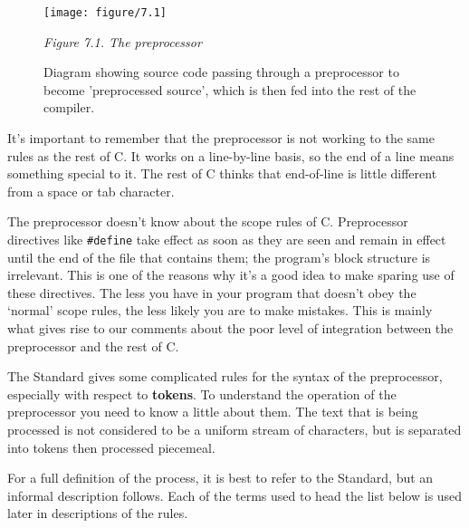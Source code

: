    \begin{figure*}[htb]\centering
     \texttt{[image: figure/7.1]}
     \caption{Diagram showing source code
       passing through a preprocessor to become 'preprocessed source',
       which is then fed into the rest of the compiler.}
   \begin{center}\textit{Figure 7.1. The preprocessor}\end{center}
   \end{figure*}



  It's important to remember that the preprocessor is not working to the
   same rules as the rest of C. It works on a line-by-line basis, so the end
   of a line means something special to it. The rest of C thinks that
   end-of-line is little different from a space or tab character.


  The preprocessor doesn't know about the scope rules of C. Preprocessor
   directives like \texttt{\#define} take effect as soon as they are seen
   and remain in effect until the end of the file that contains them; the
   program's block structure is irrelevant. This is one of the reasons why
   it's a good idea to make sparing use of these directives. The less you
   have in your program that doesn't obey the `normal' scope rules,
   the less likely you are to make mistakes. This is mainly what gives rise
   to our comments about the poor level of integration between the
   preprocessor and the rest of C.


  The Standard gives some complicated rules for the syntax of the
   preprocessor, especially with respect to \textbf{tokens}. To understand
   the operation of the preprocessor you need to know a little about them.
   The text that is being processed is not considered to be a uniform stream
   of characters, but is separated into tokens then processed piecemeal.


  For a full definition of the process, it is best to refer to the
   Standard, but an informal description follows. Each of the terms used to
   head the list below is used later in descriptions of the rules.



